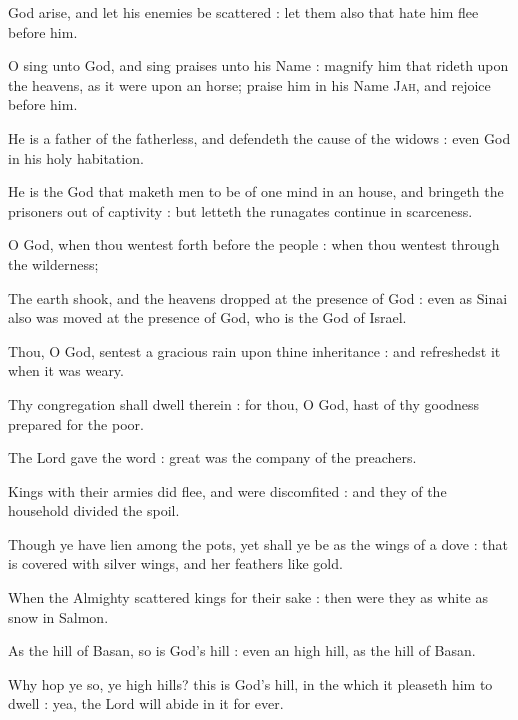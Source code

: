  God arise, and let his enemies be scattered : let them also that hate him flee before him.\par
{}
O sing unto God, and sing praises unto his Name : magnify him that rideth upon the heavens, as it were upon an horse; praise him in his Name \textsc{Jah}, and rejoice before him.\par
{}He is a father of the fatherless, and defendeth the cause of the widows : even God in his holy habitation.\par
{}He is the God that maketh men to be of one mind in an house, and bringeth the prisoners out of captivity : but letteth the runagates continue in scarceness.\par
{}O God, when thou wentest forth before the people : when thou wentest through the wilderness;\par
{}The earth shook, and the heavens dropped at the presence of God : even as Sinai also was moved at the presence of God, who is the God of Israel.\par
{}Thou, O God, sentest a gracious rain upon thine inheritance : and refreshedst it when it was weary.\par
{}Thy congregation shall dwell therein : for thou, O God, hast of thy goodness prepared for the poor.\par
{}The Lord gave the word : great was the company of the preachers.\par
{}Kings with their armies did flee, and were discomfited : and they of the household divided the spoil.\par
{}Though ye have lien among the pots, yet shall ye be as the wings of a dove : that is covered with silver wings, and her feathers like gold.\par
{}When the Almighty scattered kings for their sake : then were they as white as snow in Salmon.\par
{}As the hill of Basan, so is God's hill : even an high hill, as the hill of Basan.\par
{}Why hop ye so, ye high hills? this is God's hill, in the which it pleaseth him to dwell : yea, the Lord will abide in it for ever.\par
